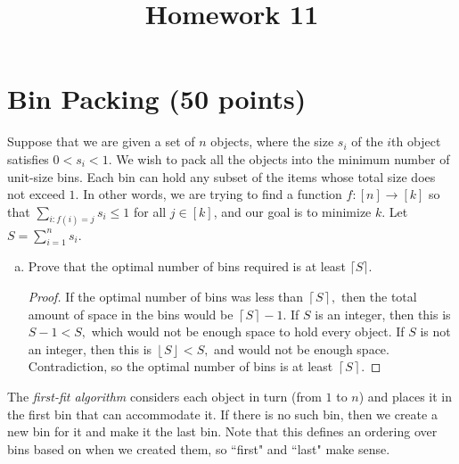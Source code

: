 \documentclass{article}
\begin{document}
\title{Homework 11}
\maketitle
\thispagestyle{fancy}

\section{Bin Packing (50 points)}
Suppose that we are given a set of $n$ objects, where the size $s_i$ of the $i$th object satisfies $0 < s_i < 1$.  We wish to pack all the objects into the minimum number of unit-size bins.  Each bin can hold any subset of the items whose total size does not exceed $1$.  In other words, we are trying to find a function $f : [n] \rightarrow [k]$ so that $\sum_{i : f(i) = j} s_i \leq 1$ for all $j \in [k]$, and our goal is to minimize $k$.  Let $S = \sum_{i=1}^n s_i$.

\begin{enumerate}[(a)]
	\item Prove that the optimal number of bins required is at least $\lceil S \rceil$.  
		\begin{proof}
			If the optimal number of bins was less than $\left\lceil S \right\rceil,$ then the total amount of space in the bins would be $\left\lceil S \right\rceil-1.$ If $S$ is an integer, then this is $S-1<S,$ which would not be enough space to hold every object. If $S$ is not an integer, then this is $\left\lfloor S \right\rfloor<S,$ and would not be enough space. Contradiction, so the optimal number of bins is at least $\left\lceil S \right\rceil.$
		\end{proof}

\end{enumerate}

The \emph{first-fit algorithm} considers each object in turn (from $1$ to $n$) and places it in the first bin that can accommodate it.  If there is no such bin, then we create a new bin for it and make it the last bin.  Note that this defines an ordering over bins based on when we created them, so ``first" and ``last" make sense.
\end{document}
